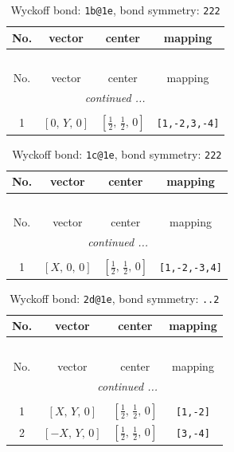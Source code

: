\documentclass[fleqn,8pt]{jsarticle}
\begin{document}
\begin{longtable}{cccc}
\caption{Wyckoff bond: {\tt 1b@1e}, bond symmetry: {\tt 222}}
 \\
 \hline \hline
No. & vector & center & mapping \\ \hline \endfirsthead

\multicolumn{3}{l}{\tablename\ \thetable{}} \\
 \hline \hline
No. & vector & center & mapping \\ \hline \endhead

 \hline \hline
\multicolumn{3}{r}{\footnotesize\it continued ...} \\ \endfoot

 \hline \hline
\multicolumn{3}{r}{} \\ \endlastfoot

1 & $\left[ 0,\, Y,\, 0 \right]$ & $\left[ \frac{1}{2},\, \frac{1}{2},\, 0 \right]$ & {\tt [1,-2,3,-4]} \\
\end{longtable}
\renewcommand{\arraystretch}{1.2}
\begin{longtable}{cccc}
\caption{Wyckoff bond: {\tt 1c@1e}, bond symmetry: {\tt 222}}
 \\
 \hline \hline
No. & vector & center & mapping \\ \hline \endfirsthead

\multicolumn{3}{l}{\tablename\ \thetable{}} \\
 \hline \hline
No. & vector & center & mapping \\ \hline \endhead

 \hline \hline
\multicolumn{3}{r}{\footnotesize\it continued ...} \\ \endfoot

 \hline \hline
\multicolumn{3}{r}{} \\ \endlastfoot

1 & $\left[ X,\, 0,\, 0 \right]$ & $\left[ \frac{1}{2},\, \frac{1}{2},\, 0 \right]$ & {\tt [1,-2,-3,4]} \\
\end{longtable}
\renewcommand{\arraystretch}{1.2}
\begin{longtable}{cccc}
\caption{Wyckoff bond: {\tt 2d@1e}, bond symmetry: {\tt ..2}}
 \\
 \hline \hline
No. & vector & center & mapping \\ \hline \endfirsthead

\multicolumn{3}{l}{\tablename\ \thetable{}} \\
 \hline \hline
No. & vector & center & mapping \\ \hline \endhead

 \hline \hline
\multicolumn{3}{r}{\footnotesize\it continued ...} \\ \endfoot

 \hline \hline
\multicolumn{3}{r}{} \\ \endlastfoot

1 & $\left[ X,\, Y,\, 0 \right]$ & $\left[ \frac{1}{2},\, \frac{1}{2},\, 0 \right]$ & {\tt [1,-2]} \\ \hline
2 & $\left[ - X,\, Y,\, 0 \right]$ & $\left[ \frac{1}{2},\, \frac{1}{2},\, 0 \right]$ & {\tt [3,-4]} \\
\end{longtable}
\end{document}
